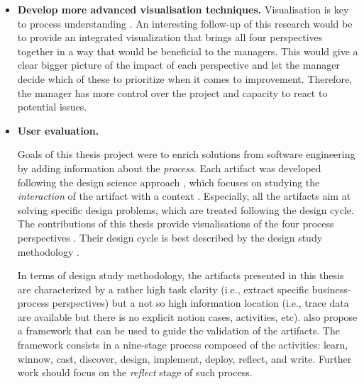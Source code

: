 \begin{itemize}
	\item {\bfseries Develop more advanced visualisation techniques.}
	Visualisation is key to process understanding \citep{DBLP:journals/corr/abs-2202-07941}. An interesting follow-up of this research would be to provide an integrated visualization that brings all four perspectives together in a way that would be beneficial to the managers. This would give a clear bigger picture of the impact of each perspective and let the manager decide which of these to prioritize when it comes to improvement. Therefore, the manager has more control over the project and capacity to react to potential issues. 
	
	\item{\bfseries User evaluation.}
	
		Goals of this thesis project were to enrich solutions from software engineering by adding information about the \emph{process}. Each artifact was developed following the design science approach \citep{Hevner2004}, which focuses on studying the \emph{interaction} of the artifact with a context \citep{DBLP:books/sp/Wieringa14}. Especially, all the artifacts aim at solving specific design problems, which are treated following the design cycle. The contributions of this thesis provide visualisations of the four process perspectives \citep{DBLP:books/sp/Aalst16}. Their design cycle is best described by the design study methodology \citep{DBLP:journals/tvcg/SedlmairMM12}. \\
		\begin{sloppypar}	
		In terms of design study methodology, the artifacts presented in this thesis are characterized by a rather high task clarity (i.e., extract specific business-process perspectives) but a not so high information location (i.e., trace data are available but there is no explicit notion cases, activities, etc). \cite{DBLP:journals/tvcg/SedlmairMM12} also propose a framework that can be used to guide the validation of the artifacts. The framework consists in a nine-stage process composed of the activities: learn, winnow, cast, discover, design, implement, deploy, reflect, and write. Further work should focus on the \emph{reflect} stage of such process. \\
		

\end{sloppypar}
\end{itemize}
